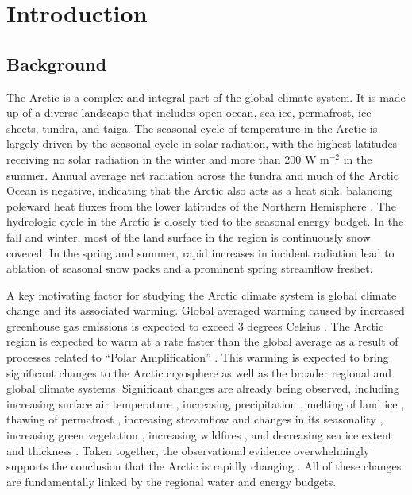 \chapter{Introduction}
\label{chap:intro}

\section{Background}

The Arctic is a complex and integral part of the global climate system.
It is made up of a diverse landscape that includes open ocean, sea ice, permafrost, ice sheets, tundra, and taiga.
The seasonal cycle of temperature in the Arctic is largely driven by the seasonal cycle in solar radiation, with the highest latitudes receiving no solar radiation in the winter and more than 200 W m$^{-2}$ in the summer. %
Annual average net radiation across the tundra and much of the Arctic Ocean is negative, indicating that the Arctic also acts as a heat sink, balancing poleward heat fluxes from the lower latitudes of the Northern Hemisphere \citep{Serreze_2007}.
The hydrologic cycle in the Arctic is closely tied to the seasonal energy budget.
In the fall and winter, most of the land surface in the region is continuously snow covered.
In the spring and summer, rapid increases in incident radiation lead to ablation of seasonal snow packs and a prominent spring streamflow freshet.

A key motivating factor for studying the Arctic climate system is global climate change and its associated warming.
Global averaged warming caused by increased greenhouse gas emissions is expected to exceed 3 degrees Celsius \citep{IPCC_2014}. %
The Arctic region is expected to warm at a rate faster than the global average as a result of processes related to ``Polar Amplification'' \citep[e.g.][]{Serreze_2006c,Holland_2003}. %
This warming is expected to bring significant changes to the Arctic cryosphere as well as the broader regional and global climate systems.
Significant changes are already being observed, including increasing surface air temperature \citep[e.g.][]{Rigor_2000}, increasing precipitation \citep[e.g.][]{Min_2008}, melting of land ice \citep[e.g.][]{Gardner_2011}, thawing of permafrost \citep[e.g.]{Serreze_2000,Osterkamp_1999}, increasing streamflow and changes in its seasonality \citep[e.g.][]{Dai_2009,McClelland_2006,Peterson_2002,Smith_2007,StJacques_2009}, increasing green vegetation \citep[e.g.][]{Stow_2004,Xu_2013}, increasing wildfires \citep[e.g.][]{Kely_2013}, and decreasing sea ice extent and thickness \citep[e.g.][]{Serreze_2000,Maslowski_2012}.
Taken together, the observational evidence overwhelmingly supports the conclusion that the Arctic is rapidly changing \citep{Serreze_2006b}.
All of these changes are fundamentally linked by the regional water and energy budgets.

